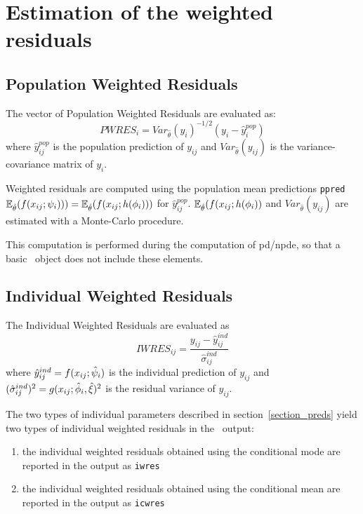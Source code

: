 \section{Estimation of the weighted residuals} \label{section_wres}

\subsection{Population Weighted Residuals}
The vector of Population Weighted Residuals are evaluated as:
$$PWRES_{i} = Var_{\hat{\theta}}(y_{i})^{-1/2} \left( y_{i} - \hat{y}^{pop}_{i} \right)$$
where $\hat{y}^{pop}_{ij}$ is the population prediction of $y_{ij}$ and $Var_{\hat{\theta}}(y_{ij})$ is the variance-covariance matrix of $y_{i}$.

Weighted residuals are computed using the population mean predictions \texttt{ppred} $\mathbb{E}_{\hat{\theta}}(f(x_{ij} ; {\psi_i}) ))=\mathbb{E}_{\hat{\theta}}(f(x_{ij} ; h({{\phi}_i}) ))$ for $\hat{y}^{pop}_{ij}$. $\mathbb{E}_{\hat{\theta}}(f(x_{ij} ; h({{\phi}_i})  )$ and $Var_{\hat{\theta}}(y_{ij})$ are estimated with a Monte-Carlo procedure.

 This computation is performed during the computation of pd/npde, so that a basic \monolix~object does not include these elements.


\subsection{Individual Weighted Residuals}

The Individual Weighted Residuals are evaluated as
$$IWRES_{ij} = \frac{y_{ij} - \hat{y}^{ind}_{ij}} {\hat{\sigma}^{ind}_{ij}}$$
where  $\hat{y}^{ind}_{ij} = f(x_{ij} ; \hat{\psi}_i )$ is the individual prediction of $y_{ij}$ and $(\hat{\sigma}^{ind}_{ij})^2 = g(x_{ij} ; \hat{{\phi}}_i,\hat{\xi})^2$ is the residual variance of $y_{ij}$.

The two types of individual parameters described in section~\ref{section_preds} yield two types of individual weighted residuals in the \monolix~output:
\begin{enumerate}
\item the individual weighted residuals obtained using the conditional mode are reported in the output as \texttt{iwres}
\item the individual weighted residuals obtained using the conditional mean are reported in the output as \texttt{icwres}
\end{enumerate}

